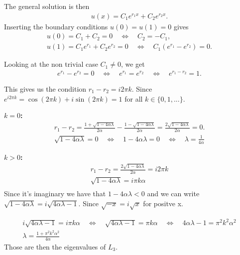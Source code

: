 \documentclass[a4paper,12pt]{article}
\theoremstyle{exerciseStyle}
\theoremstyle{solutionStyle}
\begin{document}
\begin{solution}{5.6}
    The general solution is then
    \begin{align*}
        u(x) = C_1 e^{r_1 x} + C_2 e^{r_2 x}.
    \end{align*}%
    Inserting the boundary conditions $u(0) = u(1) = 0$ gives
    \begin{align*}
        u(0) = C_1 + C_2 = 0 \quad \Longleftrightarrow \quad C_2 = -C_1, \\
        u(1) = C_1 e^{r_1} + C_2 e^{r_2} = 0 \quad \Longleftrightarrow \quad C_1 (e^{r_1} -  e^{r_2}) = 0.
    \end{align*}%

    Looking at the non trivial case $C_1 \neq 0$, we get
    \begin{align*}
        e^{r_1} -  e^{r_2} = 0 \quad \Longleftrightarrow \quad e^{r_1} =  e^{r_2} \quad \Longleftrightarrow \quad e^{r_1 - r_2} = 1.
    \end{align*}

    This gives us the condition $r_1 - r_2 = i 2 \pi k$. Since $e^{i 2 \pi k } = \cos(2 \pi k) + i \sin(2 \pi k) = 1$
    for all $k \in \{0, 1, ... \}$.

    \medskip\noindent\textbf{$k=0$:}
    \begin{align*}
        r_1 - r_2 = \frac{1 + \sqrt{1 - 4 \alpha \lambda}}{2 \alpha} - \frac{1 - \sqrt{1 - 4 \alpha \lambda}}{2 \alpha} = \frac{ 2\sqrt{1 - 4 \alpha \lambda}}{2 \alpha} = 0. \\
        \sqrt{1 - 4 \alpha \lambda} = 0 \quad \Longleftrightarrow \quad 1 - 4 \alpha \lambda = 0 \quad \Longleftrightarrow \quad \lambda = \frac{1}{4 \alpha}
    \end{align*}%

    \medskip\noindent\textbf{$k>0$:}
    \begin{align*}
        r_1 - r_2 = \frac{2 \sqrt{1 - 4 \alpha \lambda}}{2 \alpha} = i 2 \pi k \\
        \sqrt{1 - 4 \alpha \lambda} = i \pi k \alpha                           \\
    \end{align*}%
    Since it's imaginary we have that $1 - 4 \alpha \lambda < 0$ and we can write $\sqrt{1-4 \alpha \lambda} = i \sqrt{4 \alpha \lambda - 1}$.
    Since $\sqrt{-x} = i \sqrt{x}$ for positve x.

    \begin{gather*}
        i \sqrt{4 \alpha \lambda - 1} = i \pi k \alpha \quad \Longleftrightarrow \quad \sqrt{4 \alpha \lambda - 1} = \pi k \alpha \quad \Longleftrightarrow \quad 4 \alpha \lambda - 1 = \pi^2 k^2 \alpha^2 \\
        \lambda = \frac{1 + \pi^2 k^2 \alpha^2}{4 \alpha}
    \end{gather*}%
    Those are then the eigenvalues of $L_3$.


\end{solution}
\end{document}
